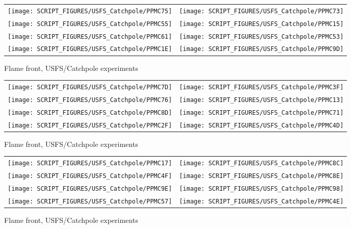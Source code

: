 \begin{figure}[p]
\begin{tabular*}{\textwidth}{l@{\extracolsep{\fill}}r}
\texttt{[image: SCRIPT\_FIGURES/USFS\_Catchpole/PPMC75]} &
\texttt{[image: SCRIPT\_FIGURES/USFS\_Catchpole/PPMC73]} \\
\texttt{[image: SCRIPT\_FIGURES/USFS\_Catchpole/PPMC55]} &
\texttt{[image: SCRIPT\_FIGURES/USFS\_Catchpole/PPMC15]} \\
\texttt{[image: SCRIPT\_FIGURES/USFS\_Catchpole/PPMC61]} &
\texttt{[image: SCRIPT\_FIGURES/USFS\_Catchpole/PPMC53]} \\
\texttt{[image: SCRIPT\_FIGURES/USFS\_Catchpole/PPMC1E]} &
\texttt{[image: SCRIPT\_FIGURES/USFS\_Catchpole/PPMC9D]} \\
\end{tabular*}
\caption[Flame front, USFS/Catchpole experiments]{Flame front, USFS/Catchpole experiments}
\label{USFS_Catchpole_208}
\end{figure}

\begin{figure}[p]
\begin{tabular*}{\textwidth}{l@{\extracolsep{\fill}}r}
\texttt{[image: SCRIPT\_FIGURES/USFS\_Catchpole/PPMC7D]} &
\texttt{[image: SCRIPT\_FIGURES/USFS\_Catchpole/PPMC3F]} \\
\texttt{[image: SCRIPT\_FIGURES/USFS\_Catchpole/PPMC76]} &
\texttt{[image: SCRIPT\_FIGURES/USFS\_Catchpole/PPMC13]} \\
\texttt{[image: SCRIPT\_FIGURES/USFS\_Catchpole/PPMC8D]} &
\texttt{[image: SCRIPT\_FIGURES/USFS\_Catchpole/PPMC71]} \\
\texttt{[image: SCRIPT\_FIGURES/USFS\_Catchpole/PPMC2F]} &
\texttt{[image: SCRIPT\_FIGURES/USFS\_Catchpole/PPMC4D]} \\
\end{tabular*}
\caption[Flame front, USFS/Catchpole experiments]{Flame front, USFS/Catchpole experiments}
\label{USFS_Catchpole_216}
\end{figure}

\FloatBarrier

\begin{figure}[p]
\begin{tabular*}{\textwidth}{l@{\extracolsep{\fill}}r}
\texttt{[image: SCRIPT\_FIGURES/USFS\_Catchpole/PPMC17]} &
\texttt{[image: SCRIPT\_FIGURES/USFS\_Catchpole/PPMC8C]} \\
\texttt{[image: SCRIPT\_FIGURES/USFS\_Catchpole/PPMC4F]} &
\texttt{[image: SCRIPT\_FIGURES/USFS\_Catchpole/PPMC8E]} \\
\texttt{[image: SCRIPT\_FIGURES/USFS\_Catchpole/PPMC9E]} &
\texttt{[image: SCRIPT\_FIGURES/USFS\_Catchpole/PPMC98]} \\
\texttt{[image: SCRIPT\_FIGURES/USFS\_Catchpole/PPMC57]} &
\texttt{[image: SCRIPT\_FIGURES/USFS\_Catchpole/PPMC4E]} \\
\end{tabular*}
\caption[Flame front, USFS/Catchpole experiments]{Flame front, USFS/Catchpole experiments}
\label{USFS_Catchpole_224}
\end{figure}

